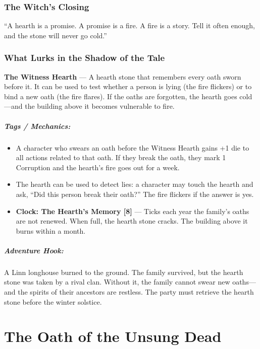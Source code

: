 \documentclass[9pt,a5paper]{extbook}
\begin{document}
\subsection*{The Witch's Closing}

``A hearth is a promise. A promise is a fire. A fire is a story. Tell it often enough, and the stone will never go cold.''

\subsection*{What Lurks in the Shadow of the Tale}

\textbf{The Witness Hearth} --- A hearth stone that remembers every oath sworn before it. It can be used to test whether a person is lying (the fire flickers) or to bind a new oath (the fire flares). If the oaths are forgotten, the hearth goes cold---and the building above it becomes vulnerable to fire.

\paragraph{Tags / Mechanics:}
\begin{itemize}
    \item A character who swears an oath before the Witness Hearth gains +1 die to all actions related to that oath. If they break the oath, they mark 1 Corruption and the hearth's fire goes out for a week.
    \item The hearth can be used to detect lies: a character may touch the hearth and ask, ``Did this person break their oath?'' The fire flickers if the answer is yes.
    \item \textbf{Clock: The Hearth's Memory [8]} --- Ticks each year the family's oaths are not renewed. When full, the hearth stone cracks. The building above it burns within a month.
\end{itemize}

\paragraph{Adventure Hook:}
A Linn longhouse burned to the ground. The family survived, but the hearth stone was taken by a rival clan. Without it, the family cannot swear new oaths---and the spirits of their ancestors are restless. The party must retrieve the hearth stone before the winter solstice.

\clearpage

\chapter{The Oath of the Unsung Dead}
\end{document}
